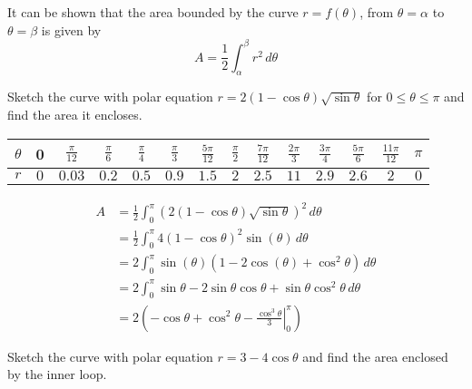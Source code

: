 	It can be shown that the area bounded by the curve $r=f(\theta)$, from $\theta = \alpha$ to $\theta = \beta$ is given by \[A = \frac12\int_\alpha^\beta r^2\,d\theta\]
	\hrulefill
	\newpage
	\begin{example}
		Sketch the curve with polar equation $r=2(1-\cos\theta)\sqrt{\sin\theta}$ for $0 \leq \theta\leq \pi$ and find the area it encloses.
	\end{example}
	\begin{center}
		\begin{tabular}{c|c|c|c|c|c|c|c|c|c|c|c|c|c}
			$\theta$ & 0   & $\frac{\pi}{12}$ & $\frac{\pi}6$ & $\frac{\pi}4$ & $\frac{\pi}3$ & $\frac{5\pi}{12}$ & $\frac\pi2$ & $\frac{7\pi}{12}$ & $\frac{2\pi}3$ & $\frac{3\pi}4$ & $\frac{5\pi}6$ & $\frac{11\pi}{12}$ & $\pi$ \\ \hline
			$r$      & $0$ & $0.03$           & $0.2$         & $0.5$         & $0.9$         & $1.5$             & $2$         & $2.5$             & $11$           & $2.9$          & $2.6$          & $2$                & $0$   
		\end{tabular}
	\end{center}
	
	\begin{fullPlot}{-3}{2}{-2}{3}
	\end{fullPlot}
	\begin{align*}
	A & =\frac12\int_0^\pi \left(2(1-\cos\theta)\sqrt{\sin\theta}\right)^2\,d\theta             \\
	& = \frac12\int_0^\pi 4(1-\cos\theta)^2\sin(\theta)\,d\theta                                \\
	& = 2\int_0^\pi \sin(\theta)(1-2\cos(\theta)+\cos^2\theta)\,d\theta\\
	&= 2\int_0^\pi \sin\theta - 2\sin\theta\cos\theta+\sin\theta\cos^2\theta\,d\theta\\
	&= 2\left(\left.-\cos\theta + \cos^2\theta - \frac{\cos^3\theta}{3}\right|_0^\pi\right)
	\end{align*}
	\newpage
	\begin{example}
		Sketch the curve with polar equation $r=3-4\cos\theta$ and find the area enclosed by the inner loop.
	\end{example}
	
